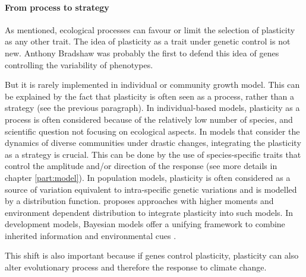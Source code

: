 {\paragraph{From process to strategy}

As mentioned, ecological processes can favour or limit the selection of plasticity as any other trait. The idea of plasticity as a trait under genetic control is not new. Anthony Bradshaw was probably the first to defend this idea of genes controlling the variability of phenotypes. 

But it is rarely implemented in individual or community growth model. This can be explained by the fact that plasticity is often seen as a process, rather than a strategy (see the previous paragraph). In individual-based models, plasticity as a process is often considered because of the relatively low number of species, and scientific question not focusing on ecological aspects. In models that consider the dynamics of diverse communities under drastic changes, integrating the plasticity as a strategy is crucial. This can be done by the use of species-specific traits that control the amplitude and/or direction of the response (see more details in chapter \ref{part:model}). In population models, plasticity is often considered as a source of variation equivalent to intra-specific genetic variations and is modelled by a distribution function. \cite{dewitt_expanding_2016} proposes approaches with higher moments and environment dependent distribution to integrate plasticity into such models. In development models, Bayesian models offer a unifying framework to combine inherited information and environmental cues \parencite{stamps_bayesian_2016}.


This shift is also important because if genes control plasticity, plasticity can also alter evolutionary process and therefore the response to climate change\cite{pfennig_phenotypic_2010, matesanz_global_2010, nicotra_plant_2010}.


}
